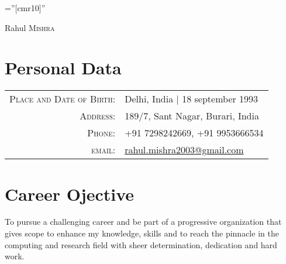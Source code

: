 \documentclass[a4paper,10pt]{article}
\begin{document}
\pagestyle{empty} %

\font\fb=''[cmr10]'' %

\par{\centering
		{\Huge Rahul \textsc{Mishra}
	}\bigskip\par}

\section{Personal Data}

\begin{tabular}{rl}
    \textsc{Place and Date of Birth:} & Delhi, India  | 18 september 1993 \\
    \textsc{Address:}   & 189/7, Sant Nagar, Burari, India \\
    \textsc{Phone:}     & +91 7298242669, +91 9953666534\\
    \textsc{email:}     & \href{mailto:rahul.mishra2003@gmail.com}{rahul.mishra2003@gmail.com}
\end{tabular}

\section{Career Ojective}
\begin{flushleft}
To pursue a challenging career and be part of a progressive organization that gives scope to enhance my knowledge, skills and to reach the pinnacle in the computing and research field with sheer determination, dedication and hard work.
\end{flushleft}


\end{document}
